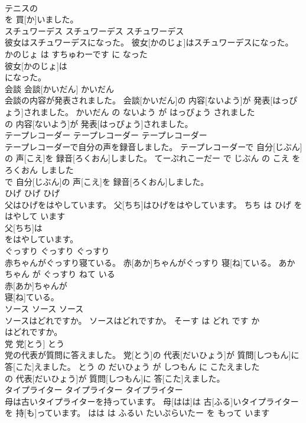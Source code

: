 \documentclass[8pt]{extreport}
\begin{document}
\begin{CJK}{UTF8}{min}
\\	テニスの
\\	を 買[か]いました。			
\\	スチュワーデス	スチュワーデス	スチュワーデス	
\\	彼女はスチュワーデスになった。	彼女[かのじょ]はスチュワーデスになった。	かのじょ は すちゅわーです に なった	
\\	彼女[かのじょ]は
\\	になった。			
\\	会談	会談[かいだん]	かいだん	
\\	会談の内容が発表されました。	会談[かいだん]の 内容[ないよう]が 発表[はっぴょう]されました。	かいだん の ないよう が はっぴょう されました	
\\	の 内容[ないよう]が 発表[はっぴょう]されました。			
\\	テープレコーダー	テープレコーダー	テープレコーダー	
\\	テープレコーダーで自分の声を録音しました。	テープレコーダーで 自分[じぶん]の 声[こえ]を 録音[ろくおん]しました。	てーぷれこーだー で じぶん の こえ を ろくおん しました	
\\	で 自分[じぶん]の 声[こえ]を 録音[ろくおん]しました。			
\\	ひげ	ひげ	ひげ	
\\	父はひげをはやしています。	父[ちち]はひげをはやしています。	ちち は ひげ を はやして います	
\\	父[ちち]は
\\	をはやしています。			
\\	ぐっすり	ぐっすり	ぐっすり	
\\	赤ちゃんがぐっすり寝ている。	赤[あか]ちゃんがぐっすり 寝[ね]ている。	あかちゃん が ぐっすり ねて いる	
\\	赤[あか]ちゃんが
\\	寝[ね]ている。			
\\	ソース	ソース	ソース	
\\	ソースはどれですか。	ソースはどれですか。	そーす は どれ です か	
\\	はどれですか。			
\\	党	党[とう]	とう	
\\	党の代表が質問に答えました。	党[とう]の 代表[だいひょう]が 質問[しつもん]に 答[こた]えました。	とう の だいひょう が しつもん に こたえました	
\\	の 代表[だいひょう]が 質問[しつもん]に 答[こた]えました。			
\\	タイプライター	タイプライター	タイプライター	
\\	母は古いタイプライターを持っています。	母[はは]は 古[ふる]いタイプライターを 持[も]っています。	はは は ふるい たいぷらいたー を もって います	

\end{CJK}
\end{document}
